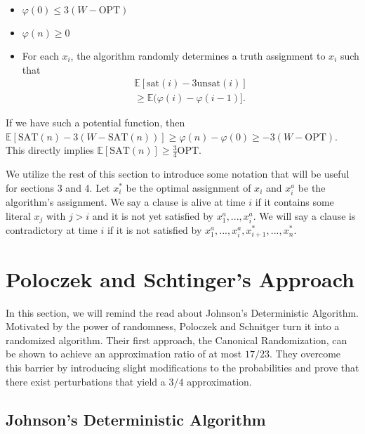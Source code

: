 \documentclass[11pt,letter]{article}
\numberwithin{theorem}{section}
\renewcommand{\phi}{\varphi}
\begin{document}
\begin{itemize}
	\item $\phi(0) \leq 3(W-\textrm{OPT})$
	\item $\phi(n) \geq 0$
	\item For each $x_i$, the algorithm randomly determines a truth assignment to $x_i$ such that
\begin{equation}
\begin{aligned}
\label{eq:2}
\mathbb{E}[\mathrm{sat}(i) - 3\mathrm{unsat}(i)] \\
\geq \mathbb{E}(\phi(i) - \phi(i-1)].
\end{aligned}
\end{equation}
\end{itemize}

If we have such a potential function, then $\mathbb{E}[\textrm{SAT}(n)- 3\left(W-\textrm{SAT}(n)\right)] \geq \phi(n) - \phi(0) \geq -3(W-\textrm{OPT})$.
This directly implies $\mathbb{E}[\textrm{SAT}(n)] \geq \frac{3}{4} \textrm{OPT}$.

We utilize the rest of this section to introduce some notation that will be useful for sections 3 and 4. Let $x_i^*$ be the optimal assignment of $x_i$ and 
$x_i^{a}$ be the algorithm's assignment. We say a clause is alive
at time $i$ if it contains some literal $x_j$ with $j > i$ and it is not yet satisfied by $x_1^a,...,x_i^a$.
We will say a clause is contradictory at time $i$ if it is not satisfied by $x_1^a,...,x_i^a,x_{i+1}^*,...,x_n^*$.



\section{Poloczek and Schtinger's Approach}\label{S:PS}

In this section,
we will remind the read about Johnson's Deterministic Algorithm. Motivated by the power of randomness, Poloczek and Schnitger 
turn it into a randomized algorithm. Their first approach, the Canonical Randomization, can be shown to achieve an approximation ratio of at most $17/23$. 
They overcome this barrier by introducing slight modifications to the probabilities and prove that there exist perturbations that yield a $3/4$ approximation. 

\subsection*{Johnson's Deterministic Algorithm}
\end{document}
